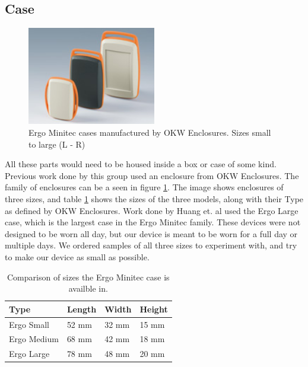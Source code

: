 \subsection{Case}
\label{Sec:Case}
\begin{figure}
\begin{center}
\includegraphics[width=0.5\textwidth]{images/OKWEN.jpg}
\caption{Ergo Minitec cases manufactured by OKW Enclosures. Sizes small to large (L - R)}
\label{Fig:OKWFam}
\end{center}
\end{figure}
All these parts would need to be housed inside a box or case of some kind.
Previous work done by this group used an enclosure from OKW Enclosures.
The family of enclosures can be a seen in figure \ref{Fig:OKWFam}.
The image shows enclosures of three sizes,
and table \ref{Tab:OKWSize} shows the sizes of the three models,
along with their Type as defined by OKW Enclosures.
Work done by Huang et. al \cite{huang2013assessment} used the Ergo Large case,
which is the largest case in the Ergo Minitec family.
These devices were not designed to be worn all day,
but our device is meant to be worn for a full day or multiple days.
We ordered samples of all three sizes to experiment with,
and try to make our device as small as possible.
\begin{table}[h]
\centering
\begin{tabular}{@{}llll@{}}
\toprule
Type & Length & Width & Height \\ \midrule
Ergo Small   & 52 mm  & 32 mm & 15 mm  \\
Ergo Medium   & 68 mm  & 42 mm & 18 mm  \\
Ergo Large   & 78 mm  & 48 mm & 20 mm  \\ \bottomrule
\end{tabular}
\caption{Comparison of sizes the Ergo Minitec case is availble in.}
\label{Tab:OKWSize}
\end{table}

